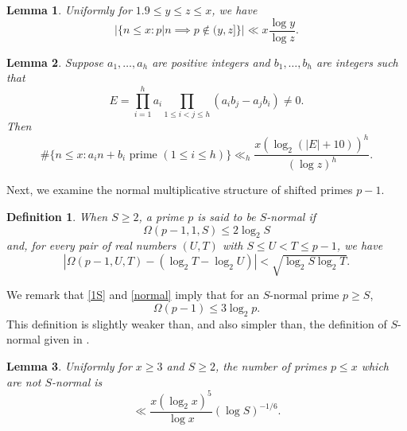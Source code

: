 \documentclass[11pt]{amsart}
\theoremstyle{remark}
\theoremstyle{plain}
\newtheorem{lem}{Lemma}[section]
\newtheorem{defn}{Definition}
\numberwithin{equation}{section}
\newcommand{\be}{\begin{equation}}
\newcommand{\ee}{\end{equation}}
\renewcommand{\(}{\left(}
\renewcommand{\)}{\right)}
\renewcommand{\le}{\leqslant}
\renewcommand{\ge}{\geqslant}
\newcommand{\om}{\Omega}
\begin{document}
\begin{lem} \label{basic sieve} 
Uniformly for $1.9\le y\le z\le x$, we have
$$
|\{ n\le x : p|n \implies p\not\in (y,z] \}| \ll x \frac{\log y}{\log z}.
$$
\end{lem}


\begin{lem} \label{sieve linear factors}
 Suppose $a_1,\ldots,a_h$ are positive integers and
$b_1,\ldots,b_h$ are integers such that
$$
E = \prod_{i=1}^h a_i \prod_{1\le i<j\le h} (a_ib_j-a_jb_i) \ne 0.
$$
Then
$$
\#\{ n\le x: a_in+b_i \text{ prime } (1\le i\le h) \}
\ll_h \frac{x(\log_2 (|E|+10))^h}{(\log z)^{h}}.
$$
\end{lem}


Next, we examine the normal multiplicative structure of shifted primes
$p-1$.

\begin{defn}
When $S\ge 2$, a prime $p$ is said to be $S$-normal if 
\be\label{1S}
\om(p-1,1,S) \le 2\log_2 S 
\ee
and, for every pair of real numbers $(U,T)$ with $S \le U<T\le p-1$, we have
\be\label{normal}
|\om(p-1,U,T) - (\log_2 T - \log_
2 U)| < \sqrt{\log_2 S \log_2 T}. 
\ee
\end{defn}

We remark that \eqref{1S} and \eqref{normal} imply that
for an $S$-normal prime $p\ge S$,
\be\label{omp-1}
\om(p-1) \le 3\log_2 p.
\ee
This definition is slightly weaker than, and also simpler than, the definition of 
$S$-normal given in \cite{F98}.

\begin{lem} \label{normal lem} Uniformly for $x\ge 3$ and $S\ge 2$,
the number of primes $p \le x$ which are not $S$-normal is 
\[
\ll \frac{x(\log_2 x)^5}{\log x} (\log S)^{-1/6}.
\]
\end{lem}
\end{document}
